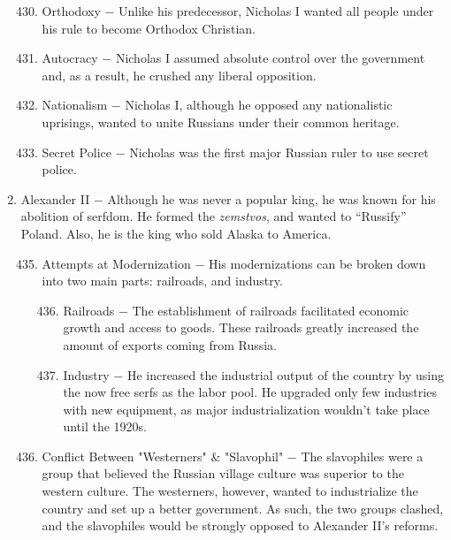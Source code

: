 \documentclass[12pt]{article}
\begin{document}
\begin{enumerate}
\begin{enumerate}[label=\arabic{*}.]
\setcounter{enumii}{429}

\item Orthodoxy $-$ Unlike his predecessor, Nicholas I wanted all people under his rule to become Orthodox Christian. 

\item Autocracy $-$ Nicholas I assumed absolute control over the government and, as a result, he crushed any liberal opposition.

\item Nationalism $-$ Nicholas I, although he opposed any nationalistic uprisings, wanted to unite Russians under their common heritage.

\item Secret Police $-$ Nicholas was the first major Russian ruler to use secret police.

\end{enumerate}

\setcounter{enumi}{433}

\item Alexander II $-$ Although he was never a popular king, he was known for his abolition of serfdom. He formed the \textit{zemstvos}, and wanted to ``Russify'' Poland. Also, he is the king who sold Alaska to America.

\begin{enumerate}[label=\arabic{*}.]
\setcounter{enumii}{434}

\item Attempts at Modernization $-$ His modernizations can be broken down into two main parts: railroads, and industry.

\begin{enumerate}[label=\arabic{*}.]
\setcounter{enumiii}{435}

\item Railroads $-$ The establishment of railroads facilitated economic growth and access to goods. These railroads greatly increased the amount of exports coming from Russia.

\item Industry $-$ He increased the industrial output of the country by using the now free serfs as the labor pool. He upgraded only few industries with new equipment, as major industrialization wouldn't take place until the 1920s.

\end{enumerate}
\setcounter{enumii}{437}

\item Conflict Between "Westerners" \& "Slavophil" $-$ The slavophiles were a group that believed the Russian village culture was superior to the western culture. The westerners, however, wanted to industrialize the country and set up a better government. As such, the two groups clashed, and the slavophiles would be strongly opposed to Alexander II's reforms.


\end{enumerate}
\end{enumerate}
\end{document}
